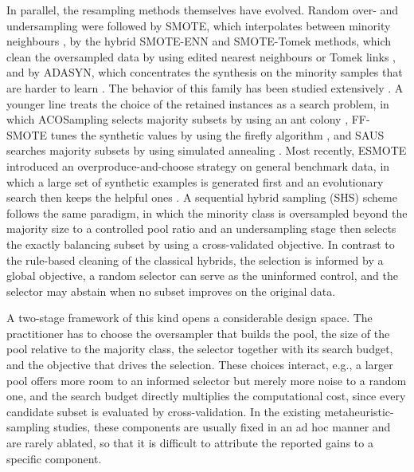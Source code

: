 \documentclass[pdflatex,sn-basic]{sn-jnl}
\begin{document}
In parallel, the resampling methods themselves have evolved. Random
over- and undersampling were followed by SMOTE, which interpolates
between minority neighbours \citep{chawla2002smote}, by the hybrid
SMOTE-ENN and SMOTE-Tomek methods, which clean the oversampled data by
using edited nearest neighbours or Tomek links \citep{batista2004study},
and by ADASYN, which concentrates the synthesis on the minority samples
that are harder to learn \citep{he2008adasyn}. The behavior of this
family has been studied extensively \citep{fernandez2018smote,
kim2022empirical, wongvorachan2023comparison, mohammed2020machine,
devi2020review}. A younger line treats the choice of the retained
instances as a search problem, in which ACOSampling selects majority
subsets by using an ant colony \citep{yu2013acosampling}, FF-SMOTE
tunes the synthetic values by using the firefly algorithm
\citep{kaur2019ffsmote}, and SAUS searches majority subsets by using
simulated annealing \citep{chennuru2022simulated}. Most recently, ESMOTE
introduced an overproduce-and-choose strategy on general benchmark data,
in which a large set of synthetic examples is generated first and an
evolutionary search then keeps the helpful ones \citep{zhang2023esmote}.
A sequential hybrid sampling (SHS) scheme follows the same paradigm, in
which the minority class is oversampled beyond the majority size to a
controlled pool ratio and an undersampling stage then selects the
exactly balancing subset by using a cross-validated objective. In
contrast to the rule-based cleaning of the classical hybrids, the
selection is informed by a global objective, a random selector can serve
as the uninformed control, and the selector may abstain when no subset
improves on the original data.

A two-stage framework of this kind opens a considerable design space.
The practitioner has to choose the oversampler that builds the pool, the
size of the pool relative to the majority class, the selector together
with its search budget, and the objective that drives the selection.
These choices interact, e.g., a larger pool offers more room to an
informed selector but merely more noise to a random one, and the search
budget directly multiplies the computational cost, since every candidate
subset is evaluated by cross-validation. In the existing
metaheuristic-sampling studies, these components are usually fixed in an
ad hoc manner and are rarely ablated, so that it is difficult to
attribute the reported gains to a specific component.
\end{document}
